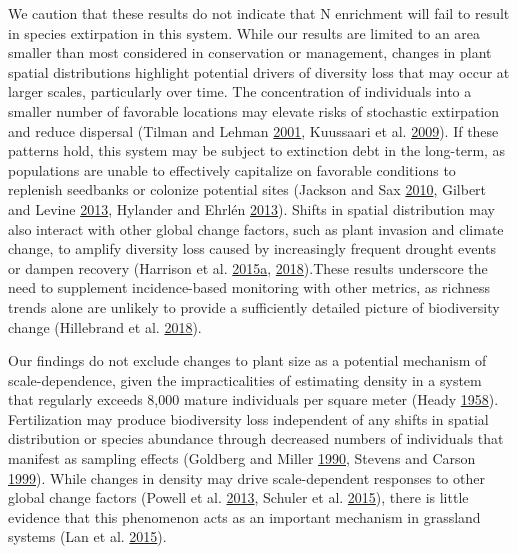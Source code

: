 \documentclass[twoside,12pt,final]{ucthesis-CA2012}
\begin{document}
\begin{ucmainmatter}
We caution that these results do not indicate that N enrichment will fail to result in species extirpation in this system. While our results are limited to an area smaller than most considered in conservation or management, changes in plant spatial distributions highlight potential drivers of diversity loss that may occur at larger scales, particularly over time. The concentration of individuals into a smaller number of favorable locations may elevate risks of stochastic extirpation and reduce dispersal (Tilman and Lehman \protect\hyperlink{ref-Tilman2001}{2001}, Kuussaari et al. \protect\hyperlink{ref-kuussaari2009}{2009}). If these patterns hold, this system may be subject to extinction debt in the long-term, as populations are unable to effectively capitalize on favorable conditions to replenish seedbanks or colonize potential sites (Jackson and Sax \protect\hyperlink{ref-jackson2010}{2010}, Gilbert and Levine \protect\hyperlink{ref-gilbert2013}{2013}, Hylander and Ehrlén \protect\hyperlink{ref-hylander2013}{2013}). Shifts in spatial distribution may also interact with other global change factors, such as plant invasion and climate change, to amplify diversity loss caused by increasingly frequent drought events or dampen recovery (Harrison et al. \protect\hyperlink{ref-harrison2015}{2015}\protect\hyperlink{ref-harrison2015}{a}, \protect\hyperlink{ref-Harrison2018}{2018}).These results underscore the need to supplement incidence-based monitoring with other metrics, as richness trends alone are unlikely to provide a sufficiently detailed picture of biodiversity change (Hillebrand et al. \protect\hyperlink{ref-hillebrand2018}{2018}).

Our findings do not exclude changes to plant size as a potential mechanism of scale-dependence, given the impracticalities of estimating density in a system that regularly exceeds 8,000 mature individuals per square meter (Heady \protect\hyperlink{ref-Heady1958}{1958}). Fertilization may produce biodiversity loss independent of any shifts in spatial distribution or species abundance through decreased numbers of individuals that manifest as sampling effects (Goldberg and Miller \protect\hyperlink{ref-goldberg1990}{1990}, Stevens and Carson \protect\hyperlink{ref-stevens1999}{1999}). While changes in density may drive scale-dependent responses to other global change factors (Powell et al. \protect\hyperlink{ref-powell2013}{2013}, Schuler et al. \protect\hyperlink{ref-schuler2015}{2015}), there is little evidence that this phenomenon acts as an important mechanism in grassland systems (Lan et al. \protect\hyperlink{ref-lan2015}{2015}).


\end{ucmainmatter}
\end{document}
